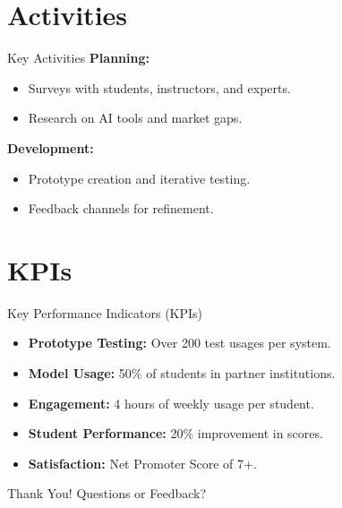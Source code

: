 \documentclass[aspectratio=169]{beamer}
\begin{document}
\section{Activities}
\begin{frame}{Key Activities}
  \textbf{Planning:}
  \begin{itemize}
    \item Surveys with students, instructors, and experts.
    \item Research on AI tools and market gaps.
  \end{itemize}
  \textbf{Development:}
  \begin{itemize}
    \item Prototype creation and iterative testing.
    \item Feedback channels for refinement.
  \end{itemize}
\end{frame}

\section{KPIs}
\begin{frame}{Key Performance Indicators (KPIs)}
  \begin{itemize}
    \item \textbf{Prototype Testing:} Over 200 test usages per system.
    \item \textbf{Model Usage:} 50\% of students in partner institutions.
    \item \textbf{Engagement:} 4 hours of weekly usage per student.
    \item \textbf{Student Performance:} 20\% improvement in scores.
    \item \textbf{Satisfaction:} Net Promoter Score of 7+.
  \end{itemize}
\end{frame}

\begin{frame}{Thank You!}
  \centering
  Questions or Feedback?
\end{frame}
\end{document}
